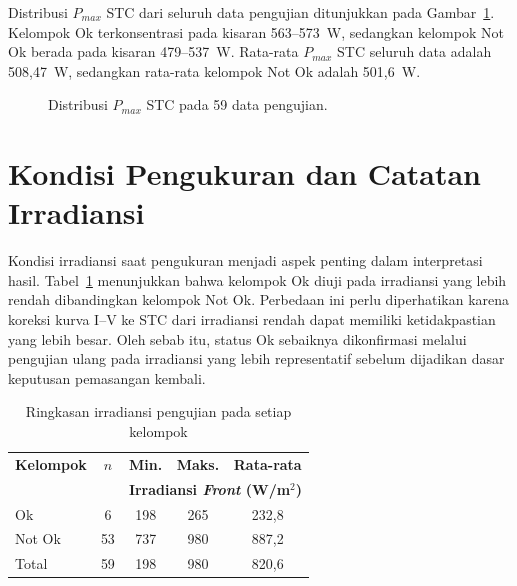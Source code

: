 Distribusi $P_{max}$ STC dari seluruh data pengujian ditunjukkan pada
Gambar~\ref{gbr:dist_pmax}. Kelompok Ok terkonsentrasi pada kisaran 563--573~W,
sedangkan kelompok Not Ok berada pada kisaran 479--537~W. Rata-rata $P_{max}$
STC seluruh data adalah 508,47~W, sedangkan rata-rata kelompok Not Ok adalah
501,6~W.

\begin{figure}[H]
\centering
{}
\caption{Distribusi $P_{max}$ STC pada 59 data pengujian.}
\label{gbr:dist_pmax}
\end{figure}

\section{Kondisi Pengukuran dan Catatan Irradiansi}

Kondisi irradiansi saat pengukuran menjadi aspek penting dalam interpretasi
hasil. Tabel~\ref{tab:kondisi_irradiance} menunjukkan bahwa kelompok Ok diuji
pada irradiansi yang lebih rendah dibandingkan kelompok Not Ok. Perbedaan ini
perlu diperhatikan karena koreksi kurva I--V ke STC dari irradiansi rendah
dapat memiliki ketidakpastian yang lebih besar. Oleh sebab itu, status Ok
sebaiknya dikonfirmasi melalui pengujian ulang pada irradiansi yang lebih
representatif sebelum dijadikan dasar keputusan pemasangan kembali.

\begin{table}[H]
\caption{Ringkasan irradiansi pengujian pada setiap kelompok}
\label{tab:kondisi_irradiance}
\centering
\begin{tabular}{lcccc}
\toprule
\textbf{Kelompok} & \textbf{$n$} & \textbf{Min.} & \textbf{Maks.} &
\textbf{Rata-rata} \\
 & & \multicolumn{3}{c}{\textbf{Irradiansi \textit{Front} (W/m$^2$)}} \\
\midrule
Ok      & 6  & 198 & 265 & 232,8 \\
Not Ok  & 53 & 737 & 980 & 887,2 \\
\midrule
Total   & 59 & 198 & 980 & 820,6 \\
\bottomrule
\end{tabular}
\end{table}

